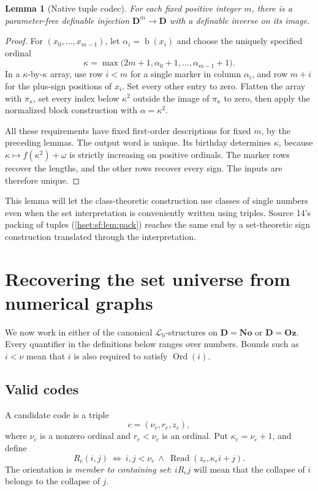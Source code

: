 \documentclass[11pt,letterpaper]{article}
\newtheorem{lemma}[lemma]{Lemma}\aliascntresetthe{lemma}
\theoremstyle{definition}
\theoremstyle{remark}
\newcommand{\No}{\mathbf{No}}
\newcommand{\Ord}{\operatorname{Ord}}
\newcommand{\bd}{\operatorname{b}}
\newcommand{\Oz}{\mathbf{Oz}}
\newcommand{\Readp}{\operatorname{Read}}
\newcommand{\Dd}{\mathbf{D}}
\newcommand{\Lb}{\mathcal L_{\mathrm b}}
\begin{document}
\begin{lemma}[Native tuple codec]\label{hset:sf:lem:tuple}
For each fixed positive integer $m$, there is a parameter-free definable
injection $\Dd^m\to\Dd$ with a definable inverse on its image.
\end{lemma}
\begin{proof}
For $(x_0,\ldots,x_{m-1})$, let $\alpha_i=\bd(x_i)$ and choose the uniquely
specified ordinal
\[
 \kappa=\max\bigl(2m+1,\alpha_0+1,\ldots,\alpha_{m-1}+1\bigr).
\]
In a $\kappa$-by-$\kappa$ array, use row $i<m$ for a single marker in column
$\alpha_i$, and row $m+i$ for the plus-sign positions of $x_i$. Set every other
entry to zero. Flatten the array with $\pi_\kappa$, set every index below
$\kappa^2$ outside the image of $\pi_\kappa$ to zero, then apply the normalized
block construction with $\alpha=\kappa^2$.

All these requirements have fixed first-order descriptions for fixed $m$, by the
preceding lemmas. The output word is unique. Its birthday determines $\kappa$,
because $\kappa\mapsto f(\kappa^2)+\omega$ is strictly increasing on positive
ordinals. The marker rows recover the lengths, and the other rows recover every
sign. The inputs are therefore unique.
\end{proof}

This lemma will let the class-theoretic construction use classes of single
numbers even when the set interpretation is conveniently written using triples.
Source 14's packing of tuples (\cref{hset:sf:lem:pack}) reaches the same end by
a set-theoretic sign construction translated through the interpretation.

\section{Recovering the set universe from numerical graphs}
\label{hset:sf:sec:graphs}

We now work in either of the canonical $\Lb$-structures on $\Dd=\No$ or
$\Dd=\Oz$. Every quantifier in the definitions below ranges over numbers. Bounds
such as $i<\nu$ mean that $i$ is also required to satisfy $\Ord(i)$.

\subsection{Valid codes}

A candidate code is a triple
\[
 c=(\nu_c,r_c,z_c),
\]
where $\nu_c$ is a nonzero ordinal and $r_c<\nu_c$ is an ordinal. Put
$\kappa_c=\nu_c+1$, and define
\begin{equation}\label{hset:sf:eq:edge}
 R_c(i,j)\ \Longleftrightarrow\ i,j<\nu_c\ \land\ \Readp(z_c,\kappa_c i+j).
\end{equation}
The orientation is \emph{member to containing set}: $iR_cj$ will mean that the
collapse of $i$ belongs to the collapse of $j$.
\end{document}
